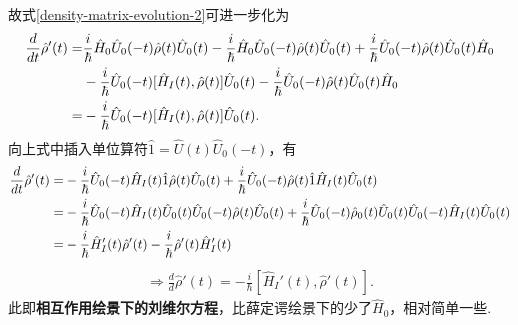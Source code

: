 \documentclass{assignment}
\begin{document}
故式\eqref{density-matrix-evolution-2}可进一步化为
\begin{align}
    \notag\frac{d}{dt}\hat{\rho}'(t)=&\frac{i}{\hbar}\hat{H}_0\hat{U}_0(-t)\hat{\rho}(t)\hat{U}_0(t)-\frac{i}{\hbar}\hat{H}_0\hat{U}_0(-t)\hat{\rho}(t)\hat{U}_0(t)+\frac{i}{\hbar}\hat{U}_0(-t)\hat{\rho}(t)\hat{U}_0(t)\hat{H}_0\\
    \notag&-\frac{i}{\hbar}\hat{U}_0(-t)[\hat{H}_I(t),\hat{\rho}(t)]\hat{U}_0(t)-\frac{i}{\hbar}\hat{U}_0(-t)\hat{\rho}(t)\hat{U}_0(t)\hat{H}_0\\
    =&-\frac{i}{\hbar}\hat{U}_0(-t)[\hat{H}_I(t),\hat{\rho}(t)]\hat{U}_0(t).
\end{align}
向上式中插入单位算符$\hat{1}=\hat{U}(t)\hat{U}_0(-t)$，有
\begin{align}
    \notag\frac{d}{dt}\hat{\rho}'(t)=&-\frac{i}{\hbar}\hat{U}_0(-t)\hat{H}_I(t)\hat{1}\hat{\rho}(t)\hat{U}_0(t)+\frac{i}{\hbar}\hat{U}_0(-t)\hat{\rho}(t)\hat{1}\hat{H}_I(t)\hat{U}_0(t)\\
    \notag=&-\frac{i}{\hbar}\hat{U}_0(-t)\hat{H}_I(t)\hat{U}_0(t)\hat{U}_0(-t)\hat{\rho}(t)\hat{U}_0(t)+\frac{i}{\hbar}\hat{U}_0(-t)\hat{\rho}_0(t)\hat{U}_0(t)\hat{U}_0(-t)\hat{H}_I(t)\hat{U}_0(t)\\
    \notag=&-\frac{i}{\hbar}\hat{H}_I'(t)\hat{\rho}'(t)-\frac{i}{\hbar}\hat{\rho}'(t)\hat{H}_I'(t)
\end{align}
\begin{align}
    \label{Liouville-equ-2}
    \Longrightarrow\boxed{\frac{d}{d}\hat{\rho}'(t)=-\frac{i}{\hbar}[\hat{H}_I'(t),\hat{\rho}'(t)]}.
\end{align}
此即\textbf{相互作用绘景下的刘维尔方程}，比薛定谔绘景下的少了$\hat{H}_0$，相对简单一些.
\end{document}
